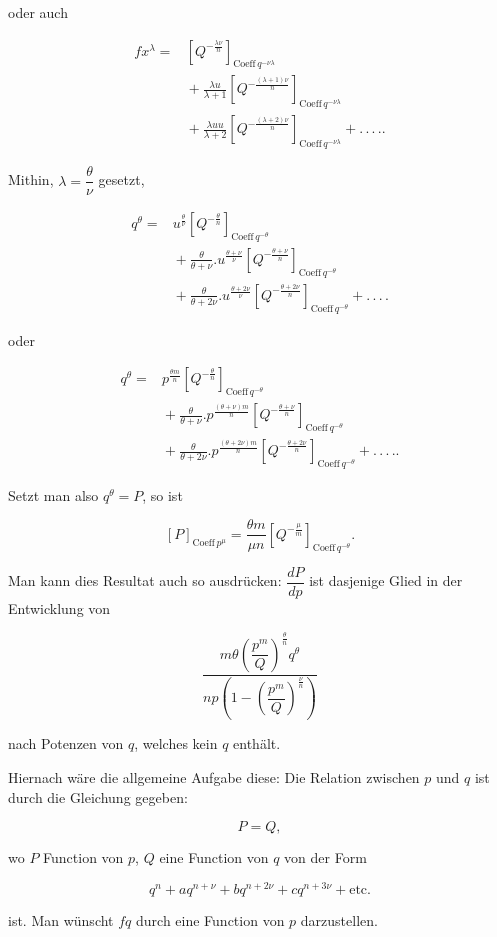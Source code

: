 \noindent oder auch

\[
\begin{aligned}fx^\lambda ={}& \left[Q^{-\frac{\lambda\nu}{n}}\right]_{\text{Coeff}\,q^{-\nu\lambda}}\\ &{}+ \frac{\lambda u}{\lambda+1}\left[Q^{-\frac{(\lambda+1)\nu}{n}}\right]_{\text{Coeff}\,q^{-\nu\lambda}}\\ &{}+ \frac{\lambda uu}{\lambda+2}\left[Q^{-\frac{(\lambda+2)\nu}{n}}\right]_{\text{Coeff}\,q^{-\nu\lambda}}+.\,.\,.\,..
\end{aligned}
\]

\noindent Mithin, $\lambda = \dfrac{\theta}{\nu}$ gesetzt,

\[
\begin{aligned}q^\theta ={}& u^{\frac{\theta}{\nu}}\left[Q^{-\frac{\theta}{n}}\right]_{\text{Coeff}\,q^{-\theta}}\\ &{}+ \frac{\theta}{\theta+\nu} .  u^{\frac{\theta+\nu}{\nu}}\left[Q^{-\frac{\theta+\nu}{n}}\right]_{\text{Coeff}\,q^{-\theta}}\\ &{}+ \frac{\theta}{\theta+2\nu} .  u^{\frac{\theta+2\nu}{\nu}}\left[Q^{-\frac{\theta+2\nu}{n}}\right]_{\text{Coeff}\,q^{-\theta}}+.\,.\,.\,.
\end{aligned}
\]

\noindent oder

\[
\begin{aligned}q^\theta ={}& p^{\frac{\theta m}{n}}\left[Q^{-\frac{\theta}{n}}\right]_{\text{Coeff}\,q^{-\theta}}\\ &{}+ \frac{\theta}{\theta+\nu} .  p^{\frac{(\theta+\nu)m}{n}}\left[Q^{-\frac{\theta+\nu}{n}}\right]_{\text{Coeff}\,q^{-\theta}}\\ &{}+ \frac{\theta}{\theta+2\nu} .  p^{\frac{(\theta+2\nu)m}{n}}\left[Q^{-\frac{\theta+2\nu}{n}}\right]_{\text{Coeff}\,q^{-\theta}}+.\,.\,.\,..
\end{aligned}
\]

Setzt man also $q^\theta = P$, so ist

\[
[P]_{\text{Coeff}\,p^\mu} = \frac{\theta m}{\mu n}\left[Q^{-\frac{\mu}{m}}\right]_{\text{Coeff}\,q^{-\theta}}.
\]

\noindent Man kann dies Resultat auch so ausdr\"ucken: $\dfrac{dP}{dp}$ ist dasjenige Glied in der Entwicklung von

\[
\frac{m\theta\left(\dfrac{p^m}{Q}\right)^{\frac{\theta}{n}}q^\theta}{np\left(1-\left(\dfrac{p^m}{Q}\right)^{\frac{\nu}{n}}\right)}
\]

\noindent nach Potenzen von $q$, welches kein $q$ enth\"alt.

Hiernach w\"are die allgemeine Aufgabe diese: Die Relation zwischen $p$ und $q$ ist durch die Gleichung gegeben:

\[
P = Q,
\]

\noindent wo $P$ Function von $p$, $Q$ eine Function von $q$ von der Form

\[
q^n+aq^{n+\nu}+bq^{n+2\nu}+cq^{n+3\nu}+\text{etc.}
\]

\noindent ist. Man w\"unscht $fq$ durch eine Function von $p$ darzustellen.

